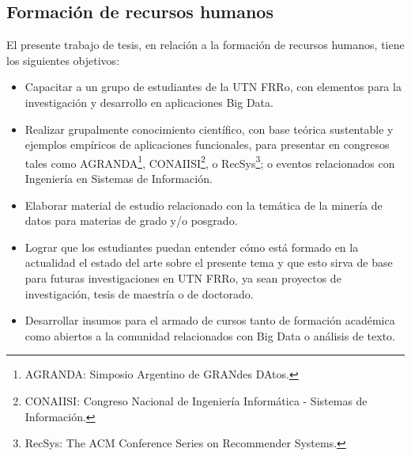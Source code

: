 \subsection{Formación de recursos humanos}
\noindent El presente trabajo de tesis, en relación a la formación de recursos humanos, tiene los siguientes objetivos: 
\begin{itemize}
	\item Capacitar a un grupo de estudiantes de la UTN FRRo, con elementos para la investigación y desarrollo en aplicaciones Big Data.
	\item Realizar grupalmente conocimiento científico, con base teórica sustentable y ejemplos empíricos de aplicaciones funcionales, para presentar en congresos tales como AGRANDA\footnote{AGRANDA: Simposio Argentino de GRANdes DAtos.}, CONAIISI\footnote{CONAIISI: Congreso Nacional de Ingeniería Informática - Sistemas de Información.}, o RecSys\footnote{RecSys: The ACM Conference Series on Recommender Systems.}; o eventos relacionados con Ingeniería en Sistemas de Información.
	\item Elaborar material de estudio relacionado con la temática de la minería de datos para materias de grado y/o posgrado.
	\item Lograr que los estudiantes puedan entender cómo está formado en la actualidad el estado del arte sobre el presente tema y que esto sirva de base para futuras investigaciones en UTN FRRo, ya sean proyectos de investigación, tesis de maestría o de doctorado.
	\item Desarrollar insumos para el armado de cursos tanto de formación académica como abiertos a la comunidad relacionados con Big Data o análisis de texto.
\end{itemize}

